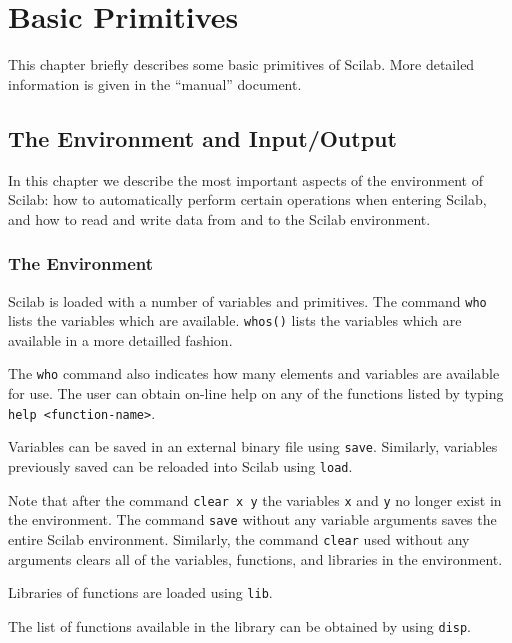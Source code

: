 
\chapter{Basic Primitives}
\label{ch5}
This chapter briefly describes some basic primitives of Scilab.
More detailed information is given in the ``manual'' document.

\section{The Environment and Input/Output}
	In this chapter we describe the most important aspects
of the environment of Scilab: how to automatically
perform certain operations when entering Scilab,
and how to read and write data
from and to the Scilab environment.

\subsection{The Environment}
\label{s5.1}

 Scilab is loaded with a number of variables and primitives.
The command {\tt who} lists the variables 
which are available. {\tt whos()} lists the variables 
which are available in a more detailled fashion.  

The {\tt who} command also indicates how many elements and variables
are available for use.  The user can obtain on-line help on any of 
the functions listed by typing {\tt help <function-name>}.

Variables can be saved in an external binary
file using {\tt save}.  
Similarly, variables previously saved can be
reloaded into Scilab using {\tt load}.

Note that after the command {\tt clear x y} 
 the variables {\tt x} and
{\tt y} no longer exist in the environment.  
The command {\tt save} without any variable arguments saves the entire 
Scilab environment.  Similarly,
the command {\tt clear} used
without any arguments clears all of the variables, functions, and libraries
in the environment.

Libraries of functions are loaded
using {\tt lib}.  

The list of functions available in the library can be obtained by using {\tt disp}.

